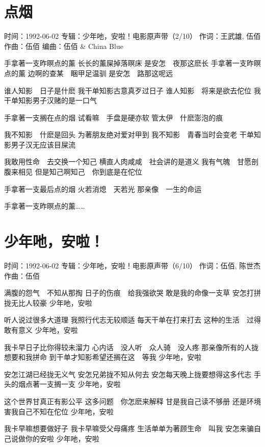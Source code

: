 \documentclass[UTF8,a4paper,oneside,twocolumn,12pt]{ctexbook}
\newcommand{\infopair}[2]{\textbullet #1：#2}
\newcommand{\zc}[1][伍佰]{\infopair{作词}{#1}}
\newcommand{\zq}[1][伍佰]{\infopair{作曲}{#1}}
\newcommand{\bq}[1][伍佰]{\infopair{编曲}{#1}}
\newcommand{\zj}[1]{\infopair{专辑}{#1}}
\newcommand{\sj}[1]{\infopair{时间}{#1}}
\newenvironment{info}{\begin{flushleft}\kaishu
	}
	{\end{flushleft}\normalsize\yahei\par}
\newenvironment{lyric}{
	}
{}
\begin{document}
\section{点烟}
\begin{info}
	\sj{1992-06-02}
	\zj{少年吔，安啦！电影原声带（2/10）}
	\zc[王武雄, 伍佰]
	\zq
	\bq[伍佰 \& China Blue]
\end{info}
\begin{lyric}
	手拿著一支昨暝点的薰
	长长的薰屎掉落暝床
	是安怎　夜那这麽长
	手拿著一支昨暝点的薰
	边啊的查某　睏甲足温驯
	是安怎　路那这呢远

	谁人知影　日子是什麽
	我干单知影古意真歹过日子
	谁人知影　将来是欲去佗位
	我干单知影男子汉赌的是一口气

	手拿著一支搁在点的烟
	试看嘛　手盘是硬亦软
	管太伊　什麽澎泡的痕

	我不知影　什麽是回头
	为著朋友绝对爱对甲到
	我不知影　青春当时会变老
	干单知影男子汉无应该目屎流

	我敢用性命　去交换一个知己
	横直人肉咸咸　社会讲的是道义
	我有气魄　甘愿剖腹来相见
	但是知己啊知己　你到底是在佗位

	手拿著一支最后点的烟
	火若消熄　天若光
	那亲像　一生的命运

	手拿著一支昨暝点的薰……
\end{lyric}

\section{少年吔，安啦！}
\begin{info}
	\sj{1992-06-02}
	\zj{少年吔，安啦！电影原声带（6/10）}
	\zc[伍佰, 陈世杰]
	\zq
\end{info}
\begin{lyric}
	满腹的怨气　不知从那掏
	日子的伤痕　给我强欲哭
	敢是我的命像一支草
	安怎打拼拢无比人较豪
	少年吔，安啦

	听人说过很多大道理
	我照行代志无较顺适
	每天干单在打来打去
	这种的生活　过得敢有意义
	少年吔，安啦

	我卡早日子比你得较未溜力
	心内话　没人听　众人骑　没人疼
	那亲像所有的人拢想要和我拼命
	到干单才知影希望还搁在这　等我
	少年吔，安啦

	安怎江湖已经拢无义气
	安怎兄弟拢不知从何去
	安怎每天晚上拢要想得这多代志
	手头的烟点著一支搁一支
	少年吔，安啦

	这个世界甘真正有影公平
	这多问题　你怎麽来解释
	甘是我自己读不够册
	还是环境害我自己不知在佗位
	少年吔，安啦

	我卡早嘛想要做好子
	我卡早嘛受父母痛疼
	生活单单为著顾生命　叫我
	安怎来骗自己说做你的安啦
	少年吔，安啦
\end{lyric}
\end{document}
